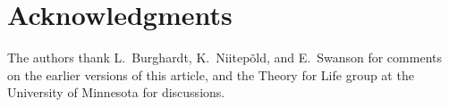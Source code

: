 \section*{Acknowledgments}
The authors thank L.\ Burghardt, K.\ Niitep\~{o}ld, and E.\ Swanson for comments on the earlier versions of this article, and the Theory for Life group at the University of Minnesota for discussions.

